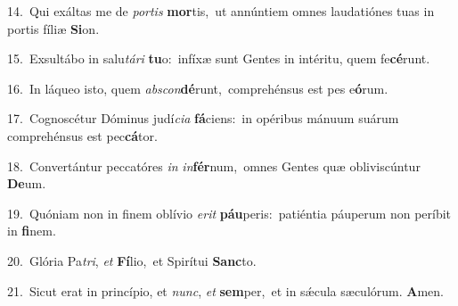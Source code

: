 {\numbfont\textcolor{\numbcolor}{14.}}~Qui exáltas me de \textit{por}\-\textit{tis} \textbf{mor}\-tis,~\star ut annúntiem omnes laudatiónes tuas in portis fíliæ \textbf{Si}\-on.\par
{\numbfont\textcolor{\numbcolor}{15.}}~Exsultábo in salu\-\textit{tá}\-\textit{ri} \textbf{tu}\-o:~\star infíxæ sunt Gentes in intéritu, quem fe\-\textbf{cé}\-runt.\par
{\numbfont\textcolor{\numbcolor}{16.}}~In láqueo isto, quem \textit{abs}\-\textit{con}\textbf{dé}runt,~\star comprehénsus est pes e\-\textbf{ó}\-rum.\par
{\numbfont\textcolor{\numbcolor}{17.}}~Cognoscétur Dóminus judí\-\textit{ci}\-\textit{a} \textbf{fá}\-ciens:~\star in opéribus mánuum suárum comprehénsus est pec\-\textbf{cá}\-tor.\par
{\numbfont\textcolor{\numbcolor}{18.}}~Convertántur peccatóres \textit{in} \textit{in}\-\textbf{fér}num,~\star omnes Gentes quæ obliviscúntur \textbf{De}\-um.\par
{\numbfont\textcolor{\numbcolor}{19.}}~Quóniam non in finem oblívio \textit{e}\-\textit{rit} \textbf{páu}\-peris:~\star patiéntia páuperum non períbit in \textbf{fi}\-nem.\par
{\numbfont\textcolor{\numbcolor}{20.}}~Glória Pa\-\textit{tri}\-, \textit{et} \textbf{Fí}\-lio,~\star et Spirítui \textbf{Sanc}\-to.\par
{\numbfont\textcolor{\numbcolor}{21.}}~Sicut erat in princípio, et \textit{nunc}\-, \textit{et} \textbf{sem}\-per,~\star et in sǽcula sæculórum. \textbf{A}\-men.\par
